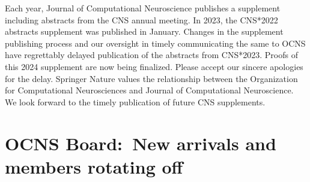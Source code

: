 \documentclass[11pt,a4paper,oneside]{article}
\begin{document}
Each year, Journal of Computational Neuroscience publishes a supplement including abstracts from the CNS annual meeting.
In 2023, the CNS*2022 abstracts supplement was published in January.
Changes in the supplement publishing process and our oversight in timely communicating the same to OCNS have regrettably delayed publication of the abstracts from CNS*2023.
Proofs of this 2024 supplement are now being finalized.
Please accept our sincere apologies for the delay.
Springer Nature values the relationship between the Organization for Computational Neurosciences and Journal of Computational Neuroscience.
We look forward to the timely publication of future CNS supplements.


\clearpage
\section*{OCNS Board:\ New arrivals and members rotating off}%
\sectionauthor{\vspace{-4ex}}
\end{document}
